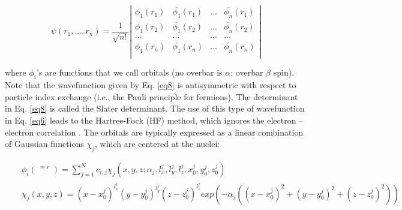 \documentclass[byrevtex,amssymb,aps,pra,floatfix,letterpaper]{revtex4}
\begin{document}
\begin{equation}
\label{eq8}
\psi(r_1,...,r_n) = \frac{1}{\sqrt{n!}}
\left|\begin{array}{cccc}
\phi_1(r_1) & \overline{\phi_1}(r_1) & ... & \overline{\phi_n}(r_1)\\
\phi_1(r_2) & \overline{\phi_1}(r_2) & ... & \overline{\phi_n}(r_2)\\
... & ... & ... & ...\\
\phi_1(r_n) & \overline{\phi_1}(r_n) & ... & \overline{\phi_n}(r_n)\\
\end{array}
\right|
\end{equation}

\noindent
where $\phi_i$'s are functions that we call orbitals (no overbar is $\alpha$; overbar $\beta$ spin). Note that the wavefunction given by Eq. \ref{eq8} is antisymmetric with respect to particle index exchange (i.e., the Pauli principle for fermions). The determinant in Eq. \ref{eq8} is called the Slater determinant. The use of this type of wavefunction in Eq. \ref{eq6} leads to the Hartree-Fock (HF) method, which ignores the electron -- electron correlation \cite{ATKINS2}. The orbitals are typically expressed as a linear combination of Gaussian functions $\chi_j$, which are centered at the nuclei:

\begin{eqnarray}
\label{eq9}
 & & \phi_i(\mathop {\overbrace{x, y, z}}^{\equiv r}) = \sum_{j=1}^{N}{c_{i,j}\chi_j(x,y,z;
\alpha_j,l_x^j,l_y^j,l_z^j,x_0^j,y_0^j,z_0^j)}\\
 & & \chi_j(x,y,z) = (x-x_0^j)^{l_x^j}(y-y_0^j)^{l_y^j}(z-z_0^j)^{l_z^j}
exp(-\alpha_j((x - x_0^j)^2 + (y - y_0^j)^2 + (z - z_0^j)^2))\nonumber
\end{eqnarray}
\end{document}
